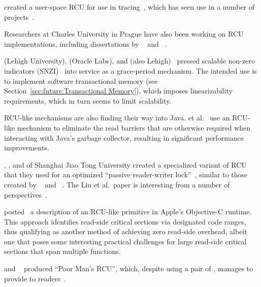  created a user-space RCU for use in
tracing~\cite{MathieuDesnoyers2009URCU,MathieuDesnoyersPhD,MathieuDesnoyers2012URCU},
which has seen use in a number of projects~\cite{MikeDay2013RCUqemu}.

Researchers at Charles University in Prague have also been
working on RCU implementations, including dissertations by
~\cite{AndrejPodzimek2010masters} and
~\cite{AdamHraska2013RCUHelenOS}.

 (Lehigh University),  (Oracle Labs), and
 (also Lehigh)~\cite{Liu:2013:MSA:2549695.2549732}
pressed scalable non-zero indicators
(SNZI)~\cite{FaithEllen:2007:SNZI} into service as a grace-period
mechanism.
The intended use is to implement software transactional memory
(see Section~\ref{sec:future:Transactional Memory}), which
imposes linearizability requirements, which in turn seems to
limit scalability.

RCU-like mechanisms are also finding their way into Java.
 et al.~\cite{Sivaramakrishnan:2012:ERB:2258996.2259005}
use an RCU-like mechanism to eliminate the read barriers that are
otherwise required when interacting with Java's garbage collector,
resulting in significant performance improvements.

, , and  of
Shanghai Jiao Tong University
created a specialized variant of RCU that they used for an optimized
``passive reader-writer lock''~\cite{RanLiu2014PassiveRWLock}, similar to
those created by ~\cite{GauthamShenoy2006RCUrwlock} and
~\cite{SrivatsaSBhat2014RCUrwlock}.
The Liu et al.\ paper is interesting from a number of
perspectives~\cite{PaulEMcKenney2014ReadMostly}.

 posted~\cite{MikeAsh2015Apple} a description of an RCU-like
primitive in Apple's Objective-C runtime.
This approach identifies read-side critical sections via designated
code ranges, thus qualifying as another method of achieving
zero read-side overhead, albeit one that poses some interesting
practical challenges for large read-side critical sections that
span multiple functions.

 and ~\cite{PedroRmalhete2015PoorMansRCU}
produced ``Poor Man's RCU'', which, despite using a pair of
, manages to provide 
 to
readers~\cite{PaulEMcKenney2015ReadMostly}.

